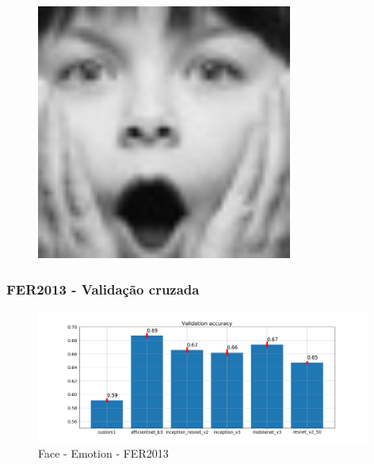 \begin{frame}
\begin{figure}[!ht]
\begin{minipage}[t]{0.20\textwidth}
      \includegraphics[width=0.75\textwidth]{images/fer2013/surprise.jpg}
    \end{minipage}
    \label{fig:fer2013}
  \end{figure}
\end{frame}


\begin{frame}
\frametitle{\textbf{FER2013} - Validação cruzada}
\begin{figure}[!ht]
    \centering
    \caption{Face - Emotion - FER2013}
    \includegraphics[width=0.98\textwidth]{images/face_emotion_fer2013/crossval.png}
\end{figure}
\end{frame}


